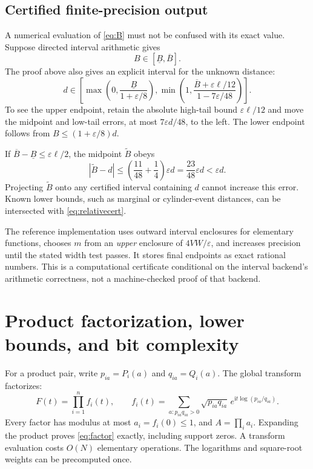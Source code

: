 \documentclass[11pt]{article}
\theoremstyle{definition}
\theoremstyle{remark}
\newcommand{\eps}{\varepsilon}
\newcommand{\ii}{\mathrm i}
\begin{document}
\subsection{Certified finite-precision output}

A numerical evaluation of \eqref{eq:B} must not be confused with its exact value. Suppose directed interval arithmetic gives
\[
 B\in[\underline B,\overline B].
\]
The proof above also gives an explicit interval for the unknown distance:
\begin{equation}
 \boxed{\quad
 d\in\left[
   \max\left(0,\frac{\underline B}{1+\eps/8}\right),
   \min\left(1,\frac{\overline B+\eps\ell/12}{1-7\eps/48}\right)
       \right].\quad}
 \label{eq:relativecert}
\end{equation}
To see the upper endpoint, retain the absolute high-tail bound $\eps\ell/12$ and move the midpoint and low-tail errors, at most $7\eps d/48$, to the left. The lower endpoint follows from $B\le(1+\eps/8)d$.

If $\overline B-\underline B\le\eps\ell/2$, the midpoint $\widetilde B$ obeys
\[
 |\widetilde B-d|\le\left(\frac{11}{48}+\frac14\right)\eps d
                  =\frac{23}{48}\eps d<\eps d.
\]
Projecting $\widetilde B$ onto any certified interval containing $d$ cannot increase this error. Known lower bounds, such as marginal or cylinder-event distances, can be intersected with \eqref{eq:relativecert}.

The reference implementation uses outward interval enclosures for elementary functions, chooses $m$ from an \emph{upper} enclosure of $4VW/\eps$, and increases precision until the stated width test passes. It stores final endpoints as exact rational numbers. This is a computational certificate conditional on the interval backend's arithmetic correctness, not a machine-checked proof of that backend.

\section{Product factorization, lower bounds, and bit complexity}
\label{sec:products}

For a product pair, write $p_{ia}=P_i(a)$ and $q_{ia}=Q_i(a)$. The global transform factorizes:
\begin{equation}
 F(t)=\prod_{i=1}^n f_i(t),\qquad
 f_i(t)=\sum_{a:p_{ia}q_{ia}>0}
      \sqrt{p_{ia}q_{ia}}\,
      e^{\ii t\log(p_{ia}/q_{ia})}.
 \label{eq:factor}
\end{equation}
Every factor has modulus at most $a_i=f_i(0)\le1$, and $A=\prod_i a_i$. Expanding the product proves \eqref{eq:factor} exactly, including support zeros. A transform evaluation costs $O(N)$ elementary operations. The logarithms and square-root weights can be precomputed once.
\end{document}
